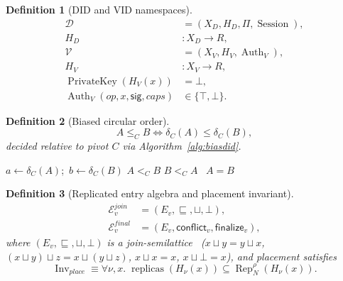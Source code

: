 \documentclass[journal]{IEEEtran}
\newtheorem{definition}{Definition}
\begin{document}
\begin{definition}[DID and VID namespaces]
\[
\begin{aligned}
  \mathcal{D} &= (X_D,H_D,\Pi,\operatorname{Session}),\\
  H_D &: X_D\to R,\\
  \mathcal{V} &= (X_V,H_V,\operatorname{Auth}_V),\\
  H_V &: X_V\to R,\\
  \operatorname{PrivateKey}(H_V(x)) &= \bot,\\
  \operatorname{Auth}_V(op,x,\mathsf{sig},caps) &\in \{\top,\bot\}.
\end{aligned}
\]
\end{definition}

\begin{definition}[Biased circular order]
\[
  A\leq_C B
  \Longleftrightarrow
  \delta_C(A)\leq\delta_C(B),
\]
decided relative to pivot $C$ via Algorithm~\ref{alg:biasdid}.
\end{definition}

\begin{algorithm}[htbp]
\caption{Biased Circular Comparison}
\label{alg:biasdid}
\begin{algorithmic}[1]
\State $a\gets \delta_C(A)$;\ $b\gets \delta_C(B)$
 \Return $A <_C B$
 \Return $B <_C A$
\Else \ \Return $A = B$
\EndIf
\EndFunction
\end{algorithmic}
\end{algorithm}

\begin{definition}[Replicated entry algebra and placement invariant]
\[
\begin{aligned}
  \mathcal{E}^{join}_v&=(E_v,\sqsubseteq,\sqcup,\bot),\\
  \mathcal{E}^{final}_v&=(E_v,\mathsf{conflict}_v,\mathsf{finalize}_v),
\end{aligned}
\]
where $(E_v,\sqsubseteq,\sqcup,\bot)$ is a join-semilattice~\cite{ShapiroCRDT}
($x\sqcup y=y\sqcup x$, $(x\sqcup y)\sqcup z=x\sqcup(y\sqcup z)$, $x\sqcup x=x$,
$x\sqcup\bot=x$), and placement satisfies
\[
  \operatorname{Inv}_{place}\equiv
  \forall \nu,x.\;
  \operatorname{replicas}(H_\nu(x))
  \subseteq
  \operatorname{Rep}^{\rho}_N(H_\nu(x)).
\]
\end{definition}
\end{document}
